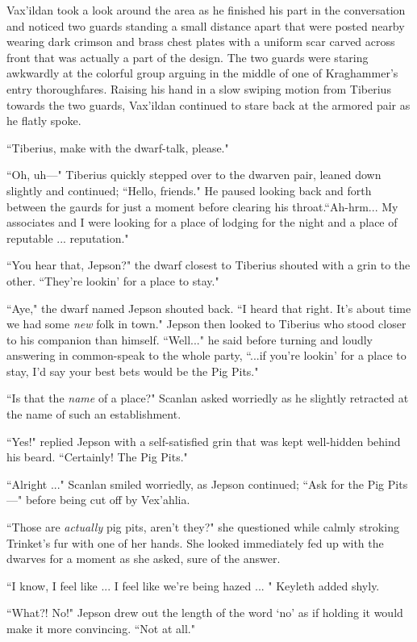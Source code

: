 Vax'ildan took a look around the area as he finished his part in the conversation and noticed two guards standing a small distance apart that were posted nearby wearing dark crimson and brass chest plates with a uniform scar carved across front that was actually a part of the design. The two guards were staring awkwardly at the colorful group arguing in the middle of one of Kraghammer's entry thoroughfares. Raising his hand in a slow swiping motion from Tiberius towards the two guards, Vax'ildan continued to stare back at the armored pair as he flatly spoke. 

``Tiberius, make with the dwarf-talk, please."

``Oh, uh---" Tiberius quickly stepped over to the dwarven pair, leaned down slightly and continued; ``Hello, friends." He  paused looking back and forth between the gaurds for just a moment before clearing his throat.``Ah-hrm... My associates and I were looking for a place of lodging for the night and a place of reputable ... reputation."

``You hear that, Jepson?" the dwarf closest to Tiberius shouted with a grin to the other. ``They're lookin' for a place to stay."

``Aye," the dwarf named Jepson shouted back. ``I heard that right. It's about time we had some \textit{new} folk in town." Jepson then looked to Tiberius who stood closer to his companion than himself. ``Well..." he said before turning and loudly answering in common-speak to the whole party, ``...if you're lookin' for a place to stay, I'd say your best bets would be the Pig Pits."

``Is that the \textit{name} of a place?" Scanlan asked worriedly as he slightly retracted at the name of such an establishment. 

``Yes!" replied Jepson with a self-satisfied grin that was kept well-hidden behind his beard. ``Certainly! The Pig Pits."

``Alright ..." Scanlan smiled worriedly, as Jepson continued; ``Ask for the Pig Pits---" before being cut off by Vex'ahlia.

``Those are \textit{actually} pig pits, aren't they?" she questioned while calmly stroking Trinket's fur with one of her hands. She looked immediately fed up with the dwarves for a moment as she asked, sure of the answer.

``I know, I feel like ... I feel like we're being hazed ... " Keyleth added shyly.

``What?! No!" Jepson drew out the length of the word `no' as if holding it would make it more convincing. ``Not at all." 

